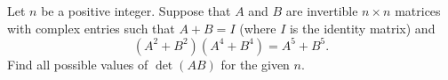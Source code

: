 Let \(n\) be a positive integer. Suppose that \(A\) and \(B\) are invertible \(n \times n\) matrices with complex entries such that \(A + B = I\) (where \(I\) is the identity matrix) and
\[
(A^2 + B^2)(A^4 + B^4) = A^5 + B^5.
\]
Find all possible values of \(\det(AB)\) for the given \(n\).
